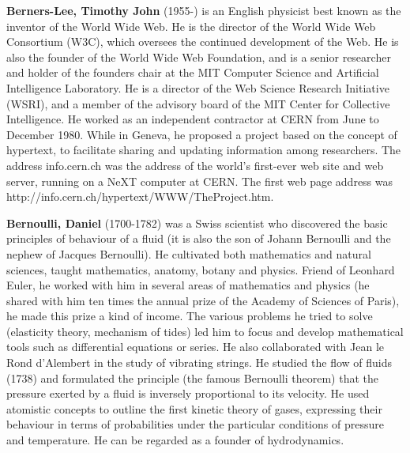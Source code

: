 \textbf{Berners-Lee, Timothy John} (1955-) is an English physicist best known as the inventor of the World Wide Web. He is the director of the World Wide Web Consortium (W3C), which oversees the continued development of the Web. He is also the founder of the World Wide Web Foundation, and is a senior researcher and holder of the founders chair at the MIT Computer Science and Artificial Intelligence Laboratory. He is a director of the Web Science Research Initiative (WSRI), and a member of the advisory board of the MIT Center for Collective Intelligence. He worked as an independent contractor at CERN from June to December 1980. While in Geneva, he proposed a project based on the concept of hypertext, to facilitate sharing and updating information among researchers. The address info.cern.ch was the address of the world's first-ever web site and web server, running on a NeXT computer at CERN. The first web page address was http://info.cern.ch/hypertext/WWW/TheProject.htm.

\textbf{Bernoulli, Daniel} (1700-1782) was a Swiss scientist who discovered the basic principles of behaviour of a fluid (it is also the son of Johann Bernoulli and the nephew of Jacques Bernoulli). He cultivated both mathematics and natural sciences, taught mathematics, anatomy, botany and physics. Friend of Leonhard Euler, he worked with him in several areas of mathematics and physics (he shared with him ten times the annual prize of the Academy of Sciences of Paris), he made this prize a kind of income. The various problems he tried to solve (elasticity theory, mechanism of tides) led him to focus and develop mathematical tools such as differential equations or series. He also collaborated with Jean le Rond d'Alembert in the study of vibrating strings. He studied the flow of fluids (1738) and formulated the principle (the famous Bernoulli theorem) that the pressure exerted by a fluid is inversely proportional to its velocity. He used atomistic concepts to outline the first kinetic theory of gases, expressing their behaviour in terms of probabilities under the particular conditions of pressure and temperature. He can be regarded as a founder of hydrodynamics.

